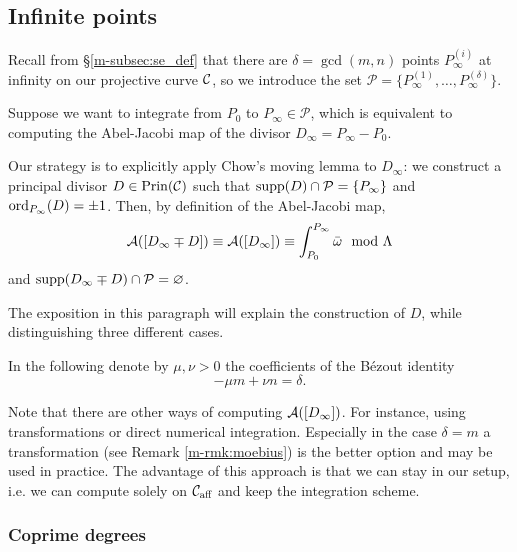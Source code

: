\documentclass[main.tex]{subfiles}
\begin{document}
  \subsection{Infinite points}\label{subsec:ajm_infty}

  Recall from \S \ref{m-subsec:se_def} that there are $\delta = \gcd(m,n)$ points $P_{\infty}^{(i)}$ at infinity on our projective curve $\mathcal{C}$, so
  we introduce the set $\mathcal{P}
  = \{ P_{\infty}^{(1)},\dots, P_{\infty}^{(\delta)} \}$.


  Suppose we want to integrate from $P_0$ to $P_{\infty} \in \mathcal{P}$, which is equivalent to computing the Abel-Jacobi map of the divisor
  $D_{\infty} = P_{\infty} - P_0$.

  Our strategy is to explicitly apply Chow's moving lemma to $D_{\infty}$: we construct a principal divisor $D \in \operatorname{Prin}(\mathcal{C})$ such that $\operatorname{supp}(D) \cap \mathcal{P} = \{ P_{\infty} \}$
  and $\operatorname{ord}_{P_{\infty}}(D) = \pm 1$. Then, by definition of the Abel-Jacobi map,
  \begin{equation*}
  \mathcal{A}([D_{\infty} \mp D]) \equiv \mathcal{A}([D_{\infty}]) \equiv \int_{P_0}^{P_{\infty}} \bar{\omega} \mod \Lambda
  \end{equation*}
  and $\operatorname{supp}(D_{\infty} \mp D) \cap \mathcal{P} = \varnothing$.

  The exposition in this paragraph will explain the construction of $D$, while distinguishing three different cases.

  In the following denote by  $\mu,\nu > 0$ the coefficients of the Bézout identity
  \begin{equation*}
    -\mu m + \nu n = \delta.
  \end{equation*}

  \begin{rmk}
   Note that there are other ways of computing $\mathcal{A}([D_{\infty}])$. For instance, using transformations or direct numerical
   integration. Especially in the case $\delta = m$ a transformation (see Remark \ref{m-rmk:moebius}) is the better option and may be used in practice.
   The advantage of this approach is that we can stay in our setup, i.e. we can compute solely on $\mathcal{C}_{\text{aff}}$ and
   keep the integration scheme.
  \end{rmk}



  \subsubsection{Coprime degrees}\label{subsec:ajm_inf_cop}
\end{document}
